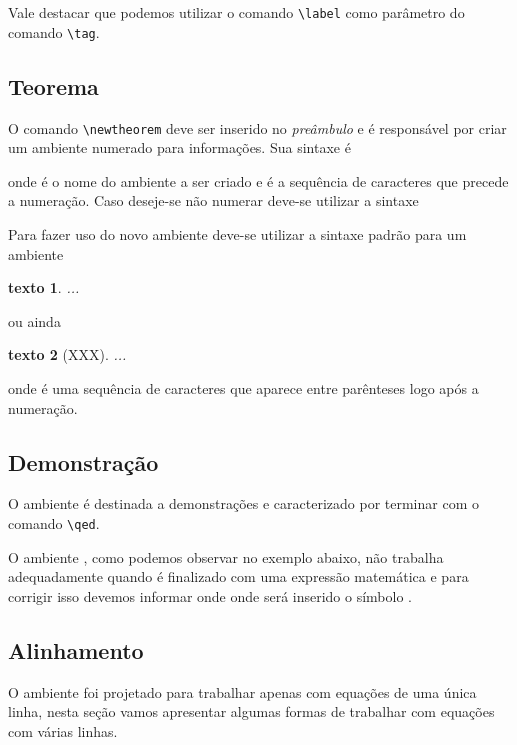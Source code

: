 Vale destacar que podemos utilizar o comando \lstinline!\label! como parâmetro
do comando \lstinline!\tag!.

\subsection{Teorema}
O comando \lstinline{\newtheorem}
deve ser inserido no \textit{preâmbulo} e é responsável por criar um ambiente
numerado para informações. Sua sintaxe é
\begin{code}
  \newtheorem{nome}{texto}
\end{code}
onde  é o nome do ambiente a ser criado e  é a
sequência de caracteres que precede a numeração. Caso deseje-se não numerar
deve-se utilizar a sintaxe
\begin{code}
  \newtheorem*{nome}{texto}
\end{code}

Para fazer uso do novo ambiente deve-se utilizar a sintaxe padrão para um
ambiente
\begin{code}
  \begin{nome}
    ...
  \end{nome}
\end{code}
ou ainda
\begin{code}
  \begin{nome}[XXX]
    ...
  \end{nome}
\end{code}
onde  é uma sequência de caracteres que aparece entre parênteses logo
após a numeração.

\subsection{Demonstração}
O ambiente  é destinada a demonstrações e caracterizado por
terminar com o comando \lstinline!\qed!. \\

O ambiente , como podemos observar no exemplo abaixo, não
trabalha adequadamente quando é finalizado com uma expressão matemática
 e para corrigir isso devemos informar onde onde será inserido
o símbolo . \\

\subsection{Alinhamento}
O ambiente  foi projetado para trabalhar apenas com equações
de uma única linha, nesta seção vamos apresentar algumas formas de trabalhar com
equações com várias linhas.

